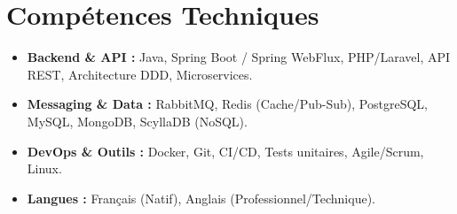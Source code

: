 \documentclass[a4paper,11pt]{article}
\begin{document}
\section{Compétences Techniques}
\begin{itemize}[leftmargin=*, nosep]
    \item \small{\textbf{Backend \& API :} Java, Spring Boot / Spring WebFlux, PHP/Laravel, API REST, Architecture DDD, Microservices.}
    \item \small{\textbf{Messaging \& Data :} RabbitMQ, Redis (Cache/Pub-Sub), PostgreSQL, MySQL, MongoDB, ScyllaDB (NoSQL).}
    \item \small{\textbf{DevOps \& Outils :} Docker, Git, CI/CD, Tests unitaires, Agile/Scrum, Linux.}
    \item \small{\textbf{Langues :} Français (Natif), Anglais (Professionnel/Technique).}
\end{itemize}

\end{document}
